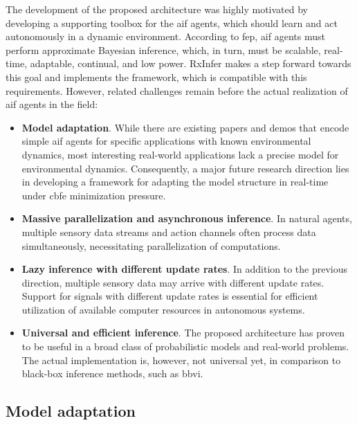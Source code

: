 The development of the proposed architecture was highly motivated by developing a supporting toolbox for the \ac{aif} agents, which should learn and act autonomously in a dynamic environment. According to \ac{fep}, \ac{aif} agents must perform approximate Bayesian inference, which, in turn, must be scalable, real-time, adaptable, continual, and low power.
RxInfer makes a step forward towards this goal and implements the framework, which is compatible with this requirements. However, related challenges remain before the actual realization of \ac{aif} agents in the field:
\begin{itemize}
    \item \textbf{Model adaptation}. While there are existing papers and demos that encode simple \ac{aif} agents for specific applications with known environmental dynamics, most interesting real-world applications lack a precise model for environmental dynamics. Consequently, a major future research direction lies in developing a framework for adapting the model structure in real-time under \ac{cbfe} minimization pressure.
    \item \textbf{Massive parallelization and asynchronous inference}. In natural agents, multiple sensory data streams and action channels often process data simultaneously, necessitating parallelization of computations.
    \item \textbf{Lazy inference with different update rates}. In addition to the previous direction, multiple sensory data may arrive with different update rates. Support for signals with different update rates is essential for efficient utilization of available computer resources in autonomous systems.
    \item \textbf{Universal and efficient inference}. The proposed architecture has proven to be useful in a broad class of probabilistic models and real-world problems. The actual implementation is, however, not universal yet, in comparison to black-box inference methods, such as \ac{bbvi}.
\end{itemize}

\subsection{Model adaptation}

